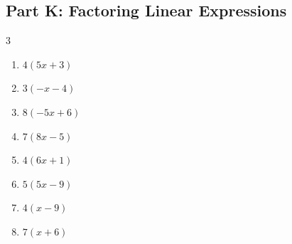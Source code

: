 \documentclass[11pt]{article}
\begin{document}
\subsection*{Part K: Factoring Linear Expressions}
\begin{multicols}{3}
\begin{enumerate}
  \item $4(5x + 3)$
  \item $3(-x - 4)$
  \item $8(-5x + 6)$
  \item $7(8x - 5)$
  \item $4(6x + 1)$
  \item $5(5x - 9)$
  \item $4(x - 9)$
  \item $7(x + 6)$
\end{enumerate}
\end{multicols}
\end{document}
